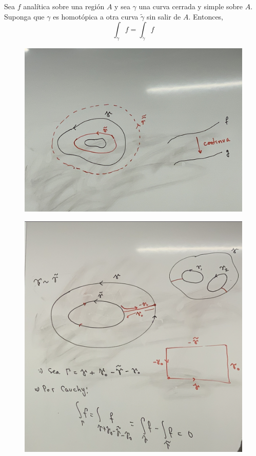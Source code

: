 \begin{teorema}[de Deformación]
    Sea $f$ analítica sobre una región $A$ y sea $\gamma$ una curva cerrada y simple sobre $A$. Suponga que $\gamma$ es homotópica a otra curva $\tilde{\gamma}$ sin salir de $A$. Entonces, 
    $$\int_\gamma f = \int_{\tilde{\gamma}}f$$ 
    \begin{figure}[H]
        \centering
        \includegraphics[scale=0.1]{imagenes/11.1.jpeg}
    \end{figure}
    \begin{figure}[H]
        \centering
        \includegraphics[scale=0.4]{imagenes/11.2}
    \end{figure}
\end{teorema}